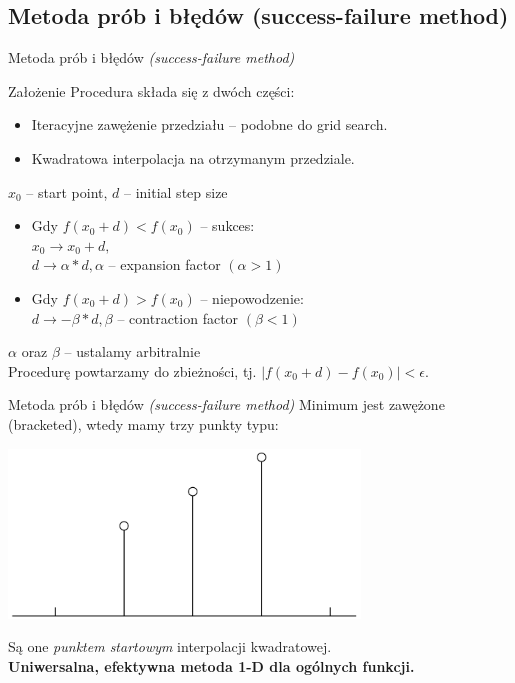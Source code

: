\subsection{Metoda prób i błędów (success-failure method)}
  \begin{frame}{Metoda prób i błędów \emph{(success-failure method)}}
    \begin{block}{Założenie}
      Procedura składa się z dwóch części:
      \begin{itemize}
        \item Iteracyjne zawężenie przedziału -- podobne do grid search.
        \item Kwadratowa interpolacja na otrzymanym przedziale.
      \end{itemize}
    \end{block}
    $x_{0}$ -- start point, $d$ -- initial step size
    \begin{itemize}
      \item Gdy $f(x_{0} + d) < f(x_{0}) $ -- sukces:\\
      $x_{0} \to x_{0} + d,$ \\
      $d \to \alpha * d, \alpha$ -- expansion factor
      $(\alpha > 1)$
      \item Gdy $f(x_{0} + d) > f(x_{0}) $ -- niepowodzenie: \\
      $d \to -\beta * d, \beta$ -- contraction factor
      $(\beta < 1)$
    \end{itemize}
    $\alpha$ oraz $\beta$ -- ustalamy arbitralnie\\
    Procedurę powtarzamy do zbieżności, tj. $|f(x_{0} + d) - f(x_{0})| < \epsilon$.
  \end{frame}

  \begin{frame}{Metoda prób i błędów \emph{(success-failure method)}}
    Minimum jest zawężone (bracketed), wtedy mamy trzy punkty typu:\\
    \begin{center}
      \includegraphics[width=0.7\textwidth]{img/17/s-f}
    \end{center}
    Są one \emph{punktem startowym} interpolacji kwadratowej.\\
    \textbf{Uniwersalna, efektywna metoda 1-D dla ogólnych funkcji.}
  \end{frame}
